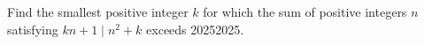 Find the smallest positive integer $k$ for which the sum of positive integers $n$ satisfying $kn+1\mid n^2+k$ exceeds 20252025.
